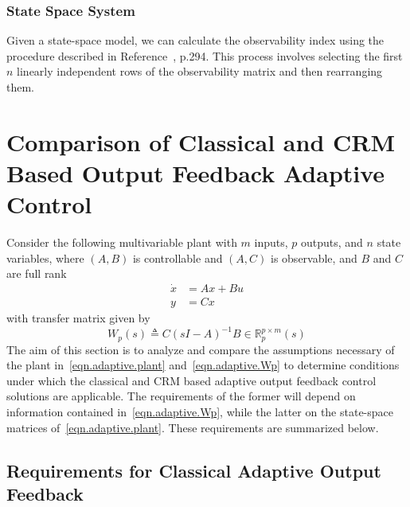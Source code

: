 \subsubsection{State Space System}

Given a state-space model, we can calculate the observability index using the procedure described in Reference~\cite{antsaklis.linearsystems.2006}, p.294.
This process involves selecting the first $n$ linearly independent rows of the observability matrix and then rearranging them.

\section{Comparison of Classical and CRM Based Output Feedback Adaptive Control}

Consider the following multivariable plant with $m$ inputs, $p$ outputs, and $n$ state variables, where $(A,B)$ is controllable and $(A,C)$ is observable, and $B$ and $C$ are full rank
\begin{equation}\label{eqn.adaptive.plant}
  \begin{split}
    \dot{x}&=Ax+Bu \\
    y&=Cx
  \end{split}
\end{equation}
with transfer matrix given by
\begin{equation}\label{eqn.adaptive.Wp}
  W_{p}(s)\triangleq C(sI-A)^{-1}B\in\mathbb{R}_{p}^{p\times m}(s)
\end{equation}
The aim of this section is to analyze and compare the assumptions necessary of the plant in~\eqref{eqn.adaptive.plant} and~\eqref{eqn.adaptive.Wp} to determine conditions under which the classical and CRM based adaptive output feedback control solutions are applicable.
The requirements of the former will depend on information contained in~\eqref{eqn.adaptive.Wp}, while the latter on the state-space matrices of~\eqref{eqn.adaptive.plant}.
These requirements are summarized below.

\subsection{Requirements for Classical Adaptive Output Feedback}

